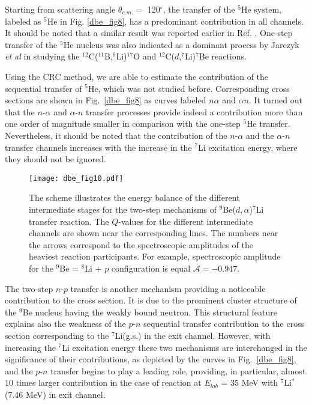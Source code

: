 \documentclass[
12pt, %
oneside, %
english, %
doublespacing, %
doublespacing, %
toctotoc, %
parskip, %
headsepline, %
]{MastersDoctoralThesis} %
\begin{document}
Starting from scattering angle $\theta_{c.m.} =$ 120$^\circ$, the transfer of the ${}^5$He system, labeled as ${}^5$He in Fig. \ref{dbe_fig8}, has a predominant contribution in all channels. It should be noted that a similar result was reported earlier in Ref. \cite{bodek1989}. One-step transfer of the ${}^5$He nucleus was also indicated as a dominant process by Jarczyk \textit{et al} \cite{jarczyk1996} in studying the ${}^{12}$C(${}^{11}$B,${}^6$Li)${}^{17}$O and ${}^{12}$C($d$,${}^7$Li)${}^{7}$Be reactions.

Using the CRC method, we are able to estimate the contribution of the sequential transfer of ${}^5$He, which was not studied before. Corresponding cross sections are shown in Fig.~\ref{dbe_fig8} as curves labeled $n\alpha$ and $\alpha n$.
It turned out that the $n$-$\alpha$ and $\alpha$-$n$ transfer processes provide indeed a contribution more than one order of magnitude smaller in comparison with the one-step ${}^5$He transfer. Nevertheless, it should be noted that the contribution of the $n$-$\alpha$ and the $\alpha$-$n$ transfer channels increases with the increase in the ${}^7$Li excitation energy, where they should not be ignored.

\begin{figure}%
\centering
\texttt{[image: dbe\_fig10.pdf]}
\decoRule
\caption{\label{dbe_fig10}  The scheme illustrates the energy balance of the different intermediate stages for the two-step mechanisms of ${}^9$Be($d,\alpha$)${}^7$Li transfer reaction. The $Q$-values for the different intermediate channels are shown near the corresponding lines. The numbers near the arrows correspond to the spectroscopic amplitudes of the heaviest reaction participants. For example, spectroscopic amplitude for the ${}^9$Be = ${}^8$Li + $p$ configuration is equal $\mathcal{A} = -0.947$.}
\end{figure}

The two-step $n$-$p$ transfer is another mechanism providing a noticeable contribution to the cross section. It is due to the prominent cluster structure of the ${}^9$Be nucleus having the weakly bound neutron. This structural feature explains also the weakness of the $p$-$n$ sequential transfer contribution to the cross section corresponding to the ${}^7$Li(g.s.) in the exit channel. However, with increasing the ${}^7$Li excitation energy these two mechanisms are interchanged in the significance of their contributions, as depicted by the curves in Fig.~\ref{dbe_fig8}, and the $p$-$n$ transfer begins to play a leading role, providing, in particular, almost 10 times larger contribution in the case of reaction at $E_{lab}$ = 35 MeV with ${}^7$Li$^*$(7.46 MeV) in exit channel.
\end{document}
